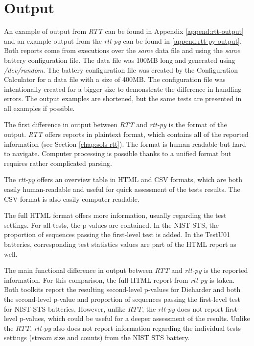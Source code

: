 \documentclass[
  digital,     %
  oneside,     %
  nosansbold,  %
  nocolorbold, %
  nolof,         %
  nolot,         %
]{fithesis4}
\begin{document}
\section{Output} \label{chap:comparison-output}
An example of output from \emph{RTT} can be found in Appendix \ref{append:rtt-output} and an example output from the \emph{rtt-py} can be found in \ref{append:rtt-py-output}. Both reports come from executions over the \emph{same} data file and using the \emph{same} battery configuration file. The data file was 100MB long and generated using \emph{/dev/random}. The battery configuration file was created by the Configuration Calculator for a data file with a size of 400MB.  The configuration file was intentionally created for a bigger size to demonstrate the difference in handling errors. The output examples are shortened, but the same tests are presented in all examples if possible.

The first difference in output between \emph{RTT} and \emph{rtt-py} is the format of the output. \emph{RTT} offers reports in plaintext format, which contains all of the reported information (see Section \ref{chap:sols-rtt}). The format is human-readable but hard to navigate. Computer processing is possible thanks to a unified format but requires rather complicated parsing.

The \emph{rtt-py} offers an overview table in HTML and CSV formats, which are both easily human-readable and useful for quick assessment of the tests results. The CSV format is also easily computer-readable. 

The full HTML format offers more information, usually regarding the test settings. For all tests, the p-values are contained. In the NIST STS, the proportion of sequences passing the first-level test is added. In the TestU01 batteries, corresponding test statistics values are part of the HTML report as well.

The main functional difference in output between \emph{RTT} and \emph{rtt-py} is the reported information. For this comparison, the full HTML report from \emph{rtt-py} is taken. Both toolkits report the resulting second-level p-values for Dieharder and both the second-level p-value and proportion of sequences passing the first-level test for NIST STS batteries. However, unlike \emph{RTT}, the \emph{rtt-py} does not report first-level p-values, which could be useful for a deeper assessment of the results. Unlike the \emph{RTT}, \emph{rtt-py} also does not report information regarding the individual tests settings (stream size and counts) from the NIST STS battery.
\end{document}
